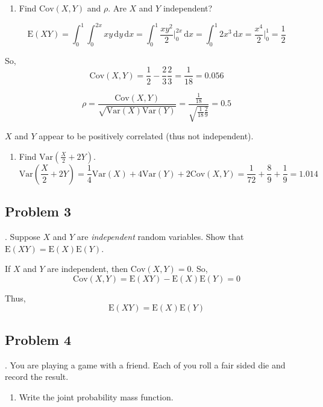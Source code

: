 \documentclass[
]{book}
\providecommand{\tightlist}{%
  \setlength{\itemsep}{0pt}\setlength{\parskip}{0pt}}
\begin{document}
\begin{enumerate}
\def\labelenumi{\alph{enumi}.}
\setcounter{enumi}{2}
\tightlist
\item
  Find \(\mbox{Cov}(X,Y)\) and \(\rho\). Are \(X\) and \(Y\) independent?
\end{enumerate}

\[
\mbox{E}(XY)=\int_0^1\int_0^{2x} xy\,\mathrm{d}y \,\mathrm{d}x = \int_0^1 \frac{xy^2}{2}\bigg|_0^{2x}\,\mathrm{d}x = \int_0^1 2x^3\,\mathrm{d}x = \frac{x^4}{2}\bigg|_0^1=\frac{1}{2}
\]

So,
\[
\mbox{Cov}(X,Y)=\frac{1}{2}-\frac{2}{3}\frac{2}{3}=\frac{1}{18}=0.056
\]

\[
\rho=\frac{\mbox{Cov}(X,Y)}{ \sqrt{\mbox{Var}(X)\mbox{Var}(Y)}}=\frac{\frac{1}{ 18}}{\sqrt{\frac{1}{18}\frac{2}{9}}}=0.5
\]

\(X\) and \(Y\) appear to be positively correlated (thus not independent).

\begin{enumerate}
\def\labelenumi{\alph{enumi}.}
\setcounter{enumi}{3}
\tightlist
\item
  Find \(\mbox{Var}\left(\frac{X}{2}+2Y\right)\).
  \[
  \mbox{Var}\left(\frac{X}{2}+2Y\right) = \frac{1}{ 4}\mbox{Var}(X)+4\mbox{Var}(Y)+2\mbox{Cov}(X,Y)=\frac{1}{72}+\frac{8}{ 9}+\frac{1}{9}=1.014
  \]
\end{enumerate}

\hypertarget{problem-3-10}{%
\subsection{Problem 3}\label{problem-3-10}}

. Suppose \(X\) and \(Y\) are \emph{independent} random variables. Show that \(\mbox{E}(XY)=\mbox{E}(X)\mbox{E}(Y)\).

If \(X\) and \(Y\) are independent, then \(\mbox{Cov}(X,Y)=0\). So,
\[
\mbox{Cov}(X,Y)=\mbox{E}(XY)-\mbox{E}(X)\mbox{E}(Y)=0
\]

Thus,
\[
\mbox{E}(XY)=\mbox{E}(X)\mbox{E}(Y)
\]

\hypertarget{problem-4-6}{%
\subsection{Problem 4}\label{problem-4-6}}

. You are playing a game with a friend. Each of you roll a fair sided die and record the result.

\begin{enumerate}
\def\labelenumi{\alph{enumi}.}
\tightlist
\item
  Write the joint probability mass function.
\end{enumerate}
\end{document}
